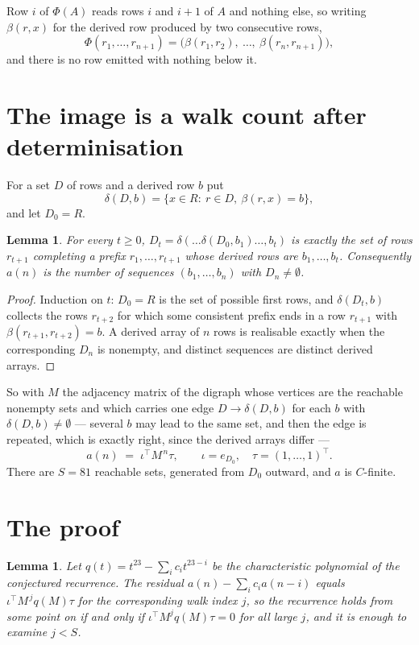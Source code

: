 \documentclass[11pt,a4paper]{article}
\theoremstyle{plain}
\newtheorem{lemma}[theorem]{Lemma}
\theoremstyle{definition}
\begin{document}
Row $i$ of $\Phi(A)$ reads rows $i$ and $i+1$ of $A$ and nothing else, so
writing $\beta(r,x)$ for the derived row produced by two consecutive rows,
\[
\Phi(r_1,\dots,r_{n+1})=\bigl(\beta(r_1,r_2),\ \dots,\ \beta(r_n,r_{n+1})\bigr),
\]
and there is no row emitted with nothing below it.

\section{The image is a walk count after determinisation}

For a set $D$ of rows and a derived row $b$ put
\[
\delta(D,b)=\{x\in R:\ r\in D,\ \beta(r,x)=b\},
\]
and let $D_0=R$.

\begin{lemma}\label{lem:det}
For every $t\ge0$, $D_t=\delta(\dots\delta(D_0,b_1)\dots,b_t)$ is exactly the set of rows
$r_{t+1}$ completing a prefix $r_1,\dots,r_{t+1}$ whose derived rows are $b_1,\dots,b_t$.
Consequently $a(n)$ is the number of sequences $(b_1,\dots,b_n)$ with $D_n\neq\emptyset$.
\end{lemma}

\begin{proof}
Induction on $t$: $D_0=R$ is the set of possible first rows, and $\delta(D_t,b)$ collects the
rows $r_{t+2}$ for which some consistent prefix ends in a row $r_{t+1}$ with
$\beta(r_{t+1},r_{t+2})=b$. A derived array of $n$ rows is realisable exactly when the
corresponding $D_n$ is nonempty, and distinct sequences are distinct derived arrays.
\end{proof}

So with $M$ the adjacency matrix of the digraph whose vertices are the reachable nonempty sets
and which carries one edge $D\to\delta(D,b)$ for each $b$ with $\delta(D,b)\neq\emptyset$ ---
several $b$ may lead to the same set, and then the edge is repeated, which is exactly right,
since the derived arrays differ ---
\[
a(n)\;=\;\iota^{\!\top}M^{\,n}\tau,\qquad \iota=e_{D_0},\quad \tau=(1,\dots,1)^{\!\top} .
\]
There are $S=81$ reachable sets, generated from $D_0$ outward, and $a$ is $C$-finite.


\section{The proof}

\begin{lemma}\label{lem:crit}
Let $q(t)=t^{23}-\sum_i c_it^{23-i}$ be the characteristic polynomial of the
conjectured recurrence. The residual $a(n)-\sum_ic_ia(n-i)$ equals
$\iota^{\!\top}M^{\,j}q(M)\tau$ for the corresponding walk index $j$, so the recurrence
holds from some point on if and only if $\iota^{\!\top}M^{j}q(M)\tau=0$ for all large $j$,
and it is enough to examine $j<S$.
\end{lemma}
\end{document}
